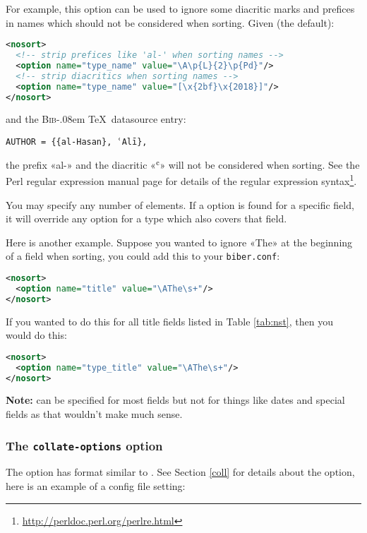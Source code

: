 \documentclass{ltxdockit}
\def\BibTeX{\textsc{Bib}\kern-.08em \TeX}
\begin{document}
For example, this option can be used to ignore some diacritic marks and prefices
in names which should not be considered when sorting. Given (the default):

\begin{lstlisting}[language=xml]
<nosort>
  <!-- strip prefices like 'al-' when sorting names -->
  <option name="type_name" value="\A\p{L}{2}\p{Pd}"/>
  <!-- strip diacritics when sorting names -->
  <option name="type_name" value="[\x{2bf}\x{2018}]"/>
</nosort>
\end{lstlisting}

\noindent and the \BibTeX\ datasource entry:

\begin{verbatim}
AUTHOR = {{al-Hasan}, ʿAlī},
\end{verbatim}

\noindent the prefix «al-» and the diacritic «ʿ» will not be considered
when sorting. See the Perl regular expression manual page for
details of the regular expression syntax\footnote{\url{http://perldoc.perl.org/perlre.html}}.

You may specify any number of  elements. If a
 option is found for a specific field, it will override
any option for a type which also covers that field.

Here is another example. Suppose you wanted to ignore «The» at the
beginning of a  field when sorting, you could add this to your
\verb+biber.conf+:

\begin{lstlisting}[language=xml]
<nosort>
  <option name="title" value="\AThe\s+"/>
</nosort>
\end{lstlisting}

\noindent If you wanted to do this for all title fields listed in Table
\ref{tab:nst}, then you would do this:

\begin{lstlisting}[language=xml]
<nosort>
  <option name="type_title" value="\AThe\s+"/>
</nosort>
\end{lstlisting}

\noindent \textbf{Note:}  can be specified for most fields but
not for things like dates and special fields as that wouldn't make much sense.
\bigskip
\subsubsection{The \texttt{collate-options} option}

The  option has format similar to
. See Section \ref{coll} for details about the option,
here is an example of a config file setting:
\end{document}
